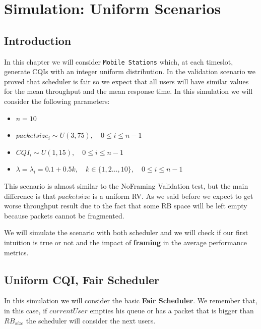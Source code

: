 \chapter{Simulation: Uniform Scenarios}
\section{Introduction}
In this chapter we will consider \texttt{Mobile Stations} which, at each timeslot, generate CQIs with an integer uniform distribution. In the validation scenario we proved that scheduler is fair so we expect that all users will have similar values for the mean throughput and the mean response time. In this simulation we will consider the following parameters:
\begin{itemize}
	\item \(n=10\)
	\item \(packetsize_{i} \sim U(3,75), \quad 0 \le i \le n-1\)
	\item \(CQI_{i} \sim U(1,15), \quad 0 \le i \le n-1\)
	\item \( \lambda = \lambda_{i} = 0.1 + 0.5k, \quad k\in\{1,2\ldots,10\}, \quad 0 \le i \le n-1\)
\end{itemize}
This scenario is almost similar to the NoFraming Validation test, but the main difference is that \(packetsize\) is a uniform RV. As we said before we expect to get worse throughput result due to the fact that some RB space will be left empty because packets cannot be fragmented. 

We will simulate the scenario with both scheduler and we will check if our first intuition is true or not and the impact of \textbf{framing} in the average performance metrics.

\section{Uniform CQI, Fair Scheduler}
In this simulation we will consider the basic \textbf{Fair Scheduler}. We remember that, in this case, if \(currentUser\) empties his queue or has a packet that is bigger than \(RB_{size}\) the scheduler will consider the next users.

